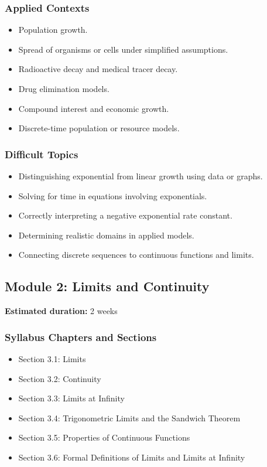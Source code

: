 \documentclass[11pt]{article}
\begin{document}
\subsubsection{Applied Contexts}

\begin{itemize}
    \item Population growth.
    \item Spread of organisms or cells under simplified assumptions.
    \item Radioactive decay and medical tracer decay.
    \item Drug elimination models.
    \item Compound interest and economic growth.
    \item Discrete-time population or resource models.
\end{itemize}

\subsubsection{Difficult Topics}

\begin{itemize}
    \item Distinguishing exponential from linear growth using data or graphs.
    \item Solving for time in equations involving exponentials.
    \item Correctly interpreting a negative exponential rate constant.
    \item Determining realistic domains in applied models.
    \item Connecting discrete sequences to continuous functions and limits.
\end{itemize}

\subsection{Module 2: Limits and Continuity}

\textbf{Estimated duration:} 2 weeks

\subsubsection{Syllabus Chapters and Sections}

\begin{itemize}
    \item Section 3.1: Limits
    \item Section 3.2: Continuity
    \item Section 3.3: Limits at Infinity
    \item Section 3.4: Trigonometric Limits and the Sandwich Theorem
    \item Section 3.5: Properties of Continuous Functions
    \item Section 3.6: Formal Definitions of Limits and Limits at Infinity
\end{itemize}
\end{document}
